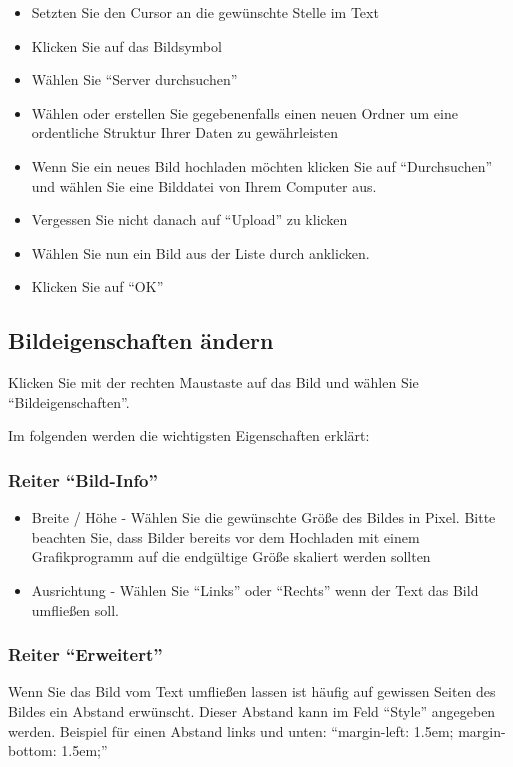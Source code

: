 \documentclass[article, a4paper, oneside, 11pt]{memoir}
\begin{document}
\begin{itemize}
\item Setzten Sie den Cursor an die gewünschte Stelle im Text
\item Klicken Sie auf das Bildsymbol
\item Wählen Sie "`Server durchsuchen"'
\item Wählen oder erstellen Sie gegebenenfalls einen neuen Ordner um eine ordentliche Struktur Ihrer Daten zu gewährleisten
\item Wenn Sie ein neues Bild hochladen möchten klicken Sie auf "`Durchsuchen"' und wählen Sie eine Bilddatei von Ihrem Computer aus.
\item Vergessen Sie nicht danach auf "`Upload"' zu klicken
\item Wählen Sie nun ein Bild aus der Liste durch anklicken.
\item Klicken Sie auf "`OK"'
\end{itemize}

\subsection{Bildeigenschaften ändern}

Klicken Sie mit der rechten Maustaste auf das Bild und wählen Sie "`Bildeigenschaften"'.

Im folgenden werden die wichtigsten Eigenschaften erklärt:

\subsubsection{Reiter "`Bild-Info"'}

\begin{itemize}
\item Breite / Höhe - Wählen Sie die gewünschte Größe des Bildes in Pixel. Bitte beachten Sie, dass Bilder bereits vor dem Hochladen mit einem Grafikprogramm auf die endgültige Größe skaliert werden sollten
\item Ausrichtung - Wählen Sie "`Links"' oder "`Rechts"' wenn der Text das Bild umfließen soll.
\end{itemize}

\subsubsection{Reiter "`Erweitert"'}

Wenn Sie das Bild vom Text umfließen lassen ist häufig auf gewissen Seiten des Bildes ein Abstand erwünscht.
Dieser Abstand kann im Feld "`Style"' angegeben werden. Beispiel für einen Abstand links und unten: "`margin-left: 1.5em; margin-bottom: 1.5em;"'
\end{document}
